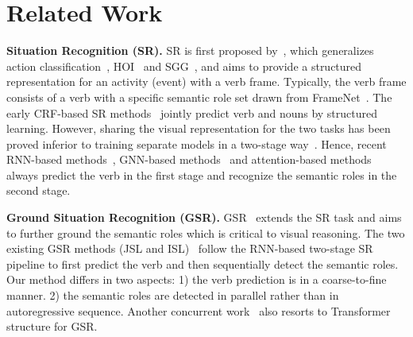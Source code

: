 \documentclass[letterpaper]{article} %
\begin{document}


\section{Related Work}
\noindent\textbf{Situation Recognition (SR).}
SR is first proposed by~\cite{gupta2015visual,yatskar2016situation}, which generalizes action classification~\cite{carreira2017quo,9151084}, HOI~\cite{liao2020ppdm,zou2021end,wei2020hose} and SGG~\cite{chen2019counterfactual,cong2021spatial}, and aims to provide a structured representation for an activity (event) with a verb frame. Typically, the verb frame consists of a verb with a specific semantic role set drawn from FrameNet~\cite{10.3115/980845.980860}. The early CRF-based SR methods~\cite{yatskar2016situation, yatskar2017commonly} jointly predict verb and nouns by structured learning. 
However, sharing the visual representation for the two tasks has been proved inferior to training separate models in a two-stage way~\cite{mallya2017recurrent}.
Hence, recent RNN-based methods~\cite{mallya2017recurrent}, GNN-based methods~\cite{li2017situation,suhail2019mixture} and attention-based methods~\cite{9156513} always predict the verb in the first stage and recognize the semantic roles in the second stage.

\noindent\textbf{Ground Situation Recognition (GSR).} GSR~\cite{yang2016grounded,silberer2018grounding,pratt2020grounded} extends the SR task and aims to further ground the semantic roles which is critical to visual reasoning. The two existing GSR methods (JSL and ISL)~\cite{pratt2020grounded} follow the RNN-based two-stage SR pipeline to first predict the verb and then sequentially detect the semantic roles.  
Our method differs in two aspects: 1) the verb prediction is in a coarse-to-fine manner. 2) the semantic roles are detected in parallel rather than in autoregressive sequence. Another concurrent work~\cite{cho2021grounded} also resorts to Transformer structure for GSR.
\end{document}
